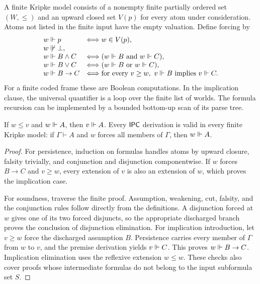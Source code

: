 A finite Kripke model consists of a nonempty finite partially ordered set
$(W,\leq)$ and an upward closed set $V(p)$ for every atom under consideration.
Atoms not listed in the finite input have the empty valuation. Define
forcing by
\[
\begin{array}{ll}
w\Vdash p &\Longleftrightarrow w\in V(p),\\
w\not\Vdash\bot,&\\
w\Vdash B\wedge C &\Longleftrightarrow
                         (w\Vdash B\ \hbox{and}\ w\Vdash C),\\
w\Vdash B\vee C &\Longleftrightarrow
                         (w\Vdash B\ \hbox{or}\ w\Vdash C),\\
w\Vdash B\to C &\Longleftrightarrow
     \text{for every }v\geq w,\ v\Vdash B\text{ implies }v\Vdash C.
\end{array}
\]
For a finite coded frame these are Boolean computations. In the implication
clause, the universal quantifier is a loop over the finite list of worlds.
The formula recursion can be implemented by a bounded bottom-up scan of
its parse tree.

\begin{lemma}
\label{lem:ipc-soundness}
If $w\leq v$ and $w\Vdash A$, then $v\Vdash A$. Every $\mathsf{IPC}$ derivation
is valid in every finite Kripke model: if $\Gamma\vdash A$ and $w$ forces
all members of $\Gamma$, then $w\Vdash A$.
\end{lemma}
\begin{proof}
For persistence, induction on formulas handles atoms by upward closure,
falsity trivially, and conjunction and disjunction componentwise. If $w$
forces $B\to C$ and $v\geq w$, every extension of $v$ is also an extension
of $w$, which proves the implication case.

For soundness, traverse the finite proof. Assumption, weakening, cut, falsity,
and the conjunction rules follow directly from the definitions. A disjunction
forced at $w$ gives one of its two forced disjuncts, so the appropriate
discharged branch proves the conclusion of disjunction elimination.
For implication introduction, let $v\geq w$ force the discharged assumption
$B$. Persistence carries every member of $\Gamma$ from $w$ to $v$, and the
premise derivation yields $v\Vdash C$. This proves $w\Vdash B\to C$.
Implication elimination uses the reflexive extension $w\leq w$.
These checks also cover proofs whose intermediate formulas do not belong
to the input subformula set $S$.
\end{proof}

